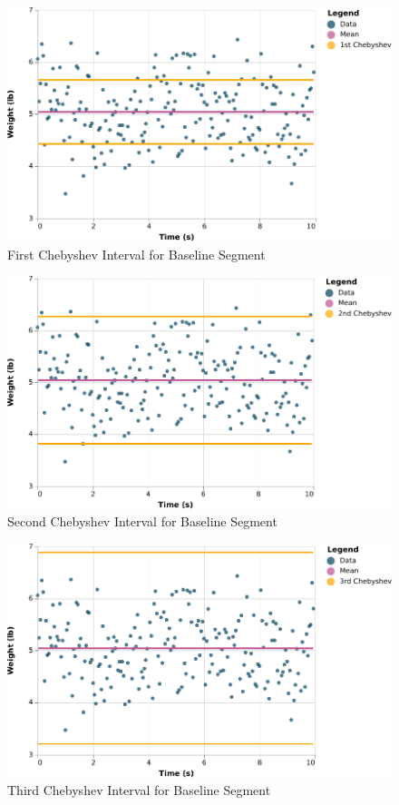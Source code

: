 \begin{figure}[ht]
    \centering
    \includegraphics{chart/00-intro/baseline-chebyshev-1.pdf}
    \caption{First Chebyshev Interval for Baseline Segment}
    \label{figure:00.baseline.chebyshev.1}
\end{figure}
\begin{figure}[ht]
    \centering
    \includegraphics{chart/00-intro/baseline-chebyshev-2.pdf}
    \caption{Second Chebyshev Interval for Baseline Segment}
    \label{figure:00.baseline.chebyshev.2}
\end{figure}
\begin{figure}[ht]
    \centering
    \includegraphics{chart/00-intro/baseline-chebyshev-3.pdf}
    \caption{Third Chebyshev Interval for Baseline Segment}
    \label{figure:00.baseline.chebyshev.3}
\end{figure}
